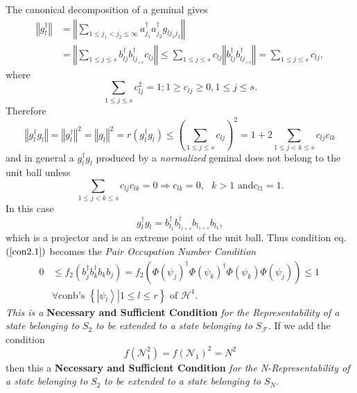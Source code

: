 \documentclass[aps,preprint]{revtex4}%
\begin{document}
The canonical decomposition of a geminal gives
\begin{align}
\left\Vert g_{l}^{\dagger}\right\Vert  &  =\left\Vert \sum_{1\leq j_{1}%
<j_{2}\leq\infty}a_{j_{1}}^{\dagger}a_{j_{2}}^{\dagger}g_{lj_{1}j_{2}%
}\right\Vert \nonumber\\
&  =\left\Vert \sum_{1\leq j\leq s}b_{lj}^{\dagger}b_{lj_{+s}}^{\dagger}%
c_{lj}\right\Vert \leq\sum_{1\leq j\leq s}c_{lj}\left\Vert b_{lj}^{\dagger
}b_{lj_{+s}}^{\dagger}\right\Vert =\sum_{1\leq j\leq s}c_{lj},
\end{align}
where
\begin{equation}
\sum_{1\leq j\leq s}c_{lj}^{2}=1;1\geq c_{lj}\geq0,1\leq j\leq s.
\end{equation}
Therefore
\begin{equation}
\left\Vert g_{l}^{\dagger}g_{l}\right\Vert =\left\Vert g_{l}^{\dagger
}\right\Vert ^{2}=\left\Vert g_{l}\right\Vert ^{2}=r\left(  g_{l}^{\dagger
}g_{l}\right)  \leq\left(  \sum_{1\leq j\leq s}c_{lj}\right)  ^{2}%
=1+2\sum_{1\leq j<k\leq s}c_{lj}c_{lk}\nonumber
\end{equation}
and in general a $g_{l}^{\dagger}g_{l}$ produced by a \emph{normalized
}geminal does not belong to the unit ball unless
\begin{equation}
\sum_{1\leq j<k\leq s}c_{lj}c_{lk}=0\Rightarrow c_{lk}=0,\text{ }k>1\text{ and
}c_{l1}=1.
\end{equation}
In this case
\begin{equation}
g_{l}^{\dagger}g_{l}=b_{l_{1}}^{\dagger}b_{l_{1+s}}^{\dagger}b_{l_{1+s}%
}b_{l_{1}},
\end{equation}
which is a projector and is an extreme point of the unit ball. Thus condition
eq. $\left(  \ref{con2.1}\right)  $ becomes the \emph{Pair Occupation Number
Condition}
\begin{align}
0  &  \leq f_{2}\left(  b_{j}^{\dagger}b_{k}^{\dagger}b_{k}b_{j}\right)
=f_{2}\left(  \Phi\left(  \psi_{j}\right)  ^{\dagger}\Phi\left(  \psi
_{k}\right)  ^{\dagger}\Phi\left(  \psi_{k}\right)  \Phi\left(  \psi
_{j}\right)  \right)  \leq1\,\nonumber\\
&  \forall\text{conb's }\left\{  \left.  \left\vert \psi_{l}\right\rangle
\right\vert 1\leq l\leq r\right\}  \text{ of }\mathcal{H}^{1}. \label{PairOcc}%
\end{align}
\emph{This is a }\textbf{Necessary and Sufficient Condition} \emph{for the
Representability of a state belonging to }$S_{2}$ \emph{to be extended to a
state belonging to }$S_{\mathcal{F}}.$ If we add the condition
\begin{equation}
f\left(  \mathcal{N}_{1}^{2}\right)  =f\left(  \mathcal{N}_{1}\right)
^{2}=N^{2}%
\end{equation}
then this a \textbf{Necessary and Sufficient Condition} \emph{for the
N-Representability of a state belonging to }$S_{2}$ \emph{to be extended to a
state belonging to }$S_{N}.$
\end{document}
